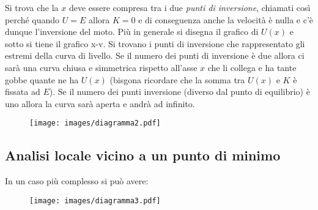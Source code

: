\documentclass[Main.tex]{subfiles}
\begin{document}
 Si trova che la $x$ deve essere compresa tra i due \emph{punti di inversione}, chiamati così  perché quando $U = E$ allora $K=0$ e di conseguenza anche la velocità è nulla e c'è dunque l'inversione del moto.
 Più  in generale si disegna il grafico di $U(x)$ e sotto si tiene il grafico x-v. Si trovano i punti di inversione che rappresentato gli estremi della curva di livello. Se il numero dei punti di inversione è due allora ci sarà una curva chiusa e simmetrica rispetto all'asse $x$ che li collega e ha tante gobbe quante ne ha $U(x)$ (bisgona ricordare che la somma tra $U(x)$ e $K$ è fissata ad $E$). Se il numero dei punti inversione (diverso dal punto di equilibrio) è uno allora la curva sarà aperta e andrà ad infinito. 
 
 \begin{figure}[H]
    \centering
    \texttt{[image: images/diagramma2.pdf]}
\end{figure}

\newpage
\subsection{Analisi locale vicino a un punto di minimo}
In un caso più  complesso si può avere:

\begin{figure}[H]
    \centering
    \texttt{[image: images/diagramma3.pdf]}
\end{figure}
\end{document}
